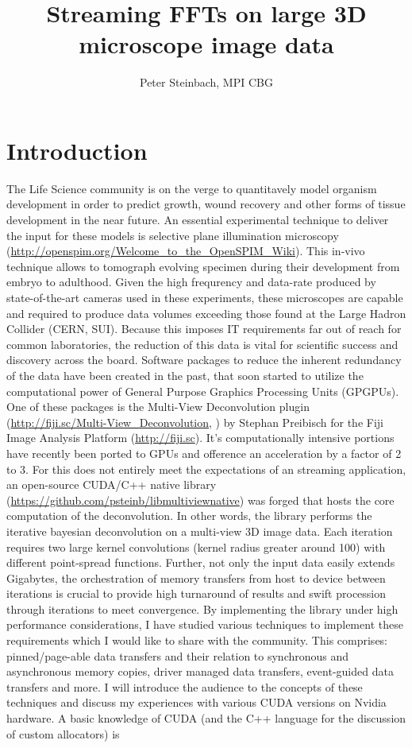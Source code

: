 \documentclass [12pt]{article}
\title{Streaming FFTs on large 3D microscope image data}
\author{Peter Steinbach, MPI CBG}
\begin{document}
\maketitle
\begin{abstract}

\end{abstract}

\section{Introduction}

  The Life Science community is on the verge to quantitavely model organism development in order to predict growth, wound recovery and other forms of tissue development in the near future. An essential experimental technique to deliver the input for these models is selective plane illumination microscopy (\url{http://openspim.org/Welcome_to_the_OpenSPIM_Wiki}). This in-vivo technique allows to tomograph evolving specimen during their development from embryo to adulthood. Given the high frequrency and data-rate produced by state-of-the-art cameras used in these experiments, these microscopes are capable and required to produce data volumes exceeding those found at the Large Hadron Collider (CERN, SUI). Because this imposes IT requirements far out of reach for common laboratories, the reduction of this data is vital for scientific success and discovery across the board. Software packages to reduce the inherent redundancy of the data have been created in the past, that soon started to utilize the computational power of General Purpose Graphics Processing Units (GPGPUs). One of these packages is the Multi-View Deconvolution plugin (\url{http://fiji.sc/Multi-View_Deconvolution}, \cite{2013arXiv1308.0730P}) by Stephan Preibisch for the Fiji Image Analysis Platform (\url{http://fiji.sc}). It's computationally intensive portions have recently been ported to GPUs and ofference an acceleration by a factor of 2 to 3. For this does not entirely meet the expectations of an streaming application, an open-source CUDA/C++ native library (\url{https://github.com/psteinb/libmultiviewnative}) was forged that hosts the core computation of the deconvolution. In other words, the library performs the iterative bayesian deconvolution on a multi-view 3D image data. Each iteration requires two large kernel convolutions (kernel radius greater around 100) with different point-spread functions. Further, not only the input data easily extends Gigabytes, the orchestration of memory transfers from host to device between iterations is crucial to provide high turnaround of results and swift procession through iterations to meet convergence. By implementing the library under high performance considerations, I have studied various techniques to implement these requirements which I would like to share with the community. This comprises: pinned/page-able data transfers and their relation to synchronous and asynchronous memory copies, driver managed data transfers, event-guided data transfers and more. I will introduce the audience to the concepts of these techniques and discuss my experiences with various CUDA versions on Nvidia hardware. A basic knowledge of CUDA (and the C++ language for the discussion of custom allocators) is 
\end{document}
